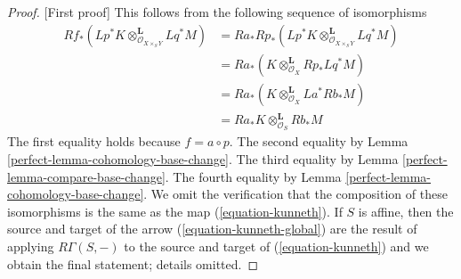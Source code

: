 \begin{proof}
[First proof]
This follows from the following sequence of isomorphisms
\begin{align*}
Rf_*(Lp^*K \otimes_{\mathcal{O}_{X \times_S Y}}^\mathbf{L} Lq^*M)
& =
Ra_*Rp_*(Lp^*K \otimes_{\mathcal{O}_{X \times_S Y}}^\mathbf{L} Lq^*M) \\
& =
Ra_*(K \otimes_{\mathcal{O}_X}^\mathbf{L} Rp_*Lq^*M) \\
& =
Ra_*(K \otimes_{\mathcal{O}_X}^\mathbf{L} La^*Rb_*M) \\
& =
Ra_*K \otimes_{\mathcal{O}_S}^\mathbf{L} Rb_*M
\end{align*}
The first equality holds because $f = a \circ p$. The second equality
by Lemma \ref{perfect-lemma-cohomology-base-change}. The third equality by
Lemma \ref{perfect-lemma-compare-base-change}.  The fourth equality by
Lemma \ref{perfect-lemma-cohomology-base-change}.
We omit the verification that the composition of these isomorphisms
is the same as the map (\ref{equation-kunneth}).
If $S$ is affine, then the source and target of the arrow
(\ref{equation-kunneth-global}) are the result of applying
$R\Gamma(S, -)$ to the source and target of (\ref{equation-kunneth})
and we obtain the final statement; details omitted.
\end{proof}

